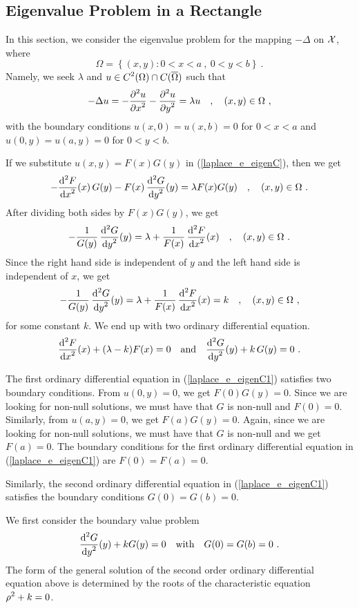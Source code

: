 \subsection{Eigenvalue Problem in a Rectangle}

In this section, we consider the eigenvalue problem for the mapping
$-\Delta$ on $\cal X$, where
\[
  \Omega =\left\{ (x,y) : 0 < x < a\ ,\ 0 < y < b \right\} \ .
\]
Namely, we seek $\lambda$ and
$\displaystyle u \in C^2(\Omega)\cap C(\overline{\Omega})$ such that
\begin{equation} \label{laplace_e_eigenC}
-\Delta u = -\frac{\displaystyle \partial^{2}{u}} {\displaystyle \partial x^{2}} - \frac{\displaystyle \partial^{2}{u}} {\displaystyle \partial y^{2}} = \lambda u
\quad , \quad (x,y) \in \Omega \ ,
\end{equation}
with the boundary conditions $u(x,0) = u(x,b) = 0$ for $0<x<a$ and
$u(0,y) = u(a,y) = 0$ for $0<y<b$.

If we substitute $u(x,y) = F(x)G(y)$ in (\ref{laplace_e_eigenC}), then
we get
\[
-\frac{\displaystyle \mathrm{d}^{2}{F}} {\displaystyle \mathrm{d}{x}^{2}}(x)\, G(y) - F(x)\,\frac{\displaystyle \mathrm{d}^{2}{G}} {\displaystyle \mathrm{d}{y}^{2}}(y) = \lambda
F(x)G(y) \quad , \quad (x,y) \in \Omega \ .
\]
After dividing both sides by $F(x)G(y)$, we get
\[
-\frac{1}{G(y)} \, \frac{\displaystyle \mathrm{d}^{2}{G}} {\displaystyle \mathrm{d}{y}^{2}}(y) =
\lambda + \frac{1}{F(x)}\,\frac{\displaystyle \mathrm{d}^{2}{F}} {\displaystyle \mathrm{d}{x}^{2}}(x)
\quad , \quad (x,y) \in \Omega \ .
\]
Since the right hand side is independent of $y$ and the left hand side
is independent of $x$, we get
\[
-\frac{1}{G(y)} \, \frac{\displaystyle \mathrm{d}^{2}{G}} {\displaystyle \mathrm{d}{y}^{2}}(y) = \lambda + \frac{1}{F(x)}\,
\frac{\displaystyle \mathrm{d}^{2}{F}} {\displaystyle \mathrm{d}{x}^{2}}(x) = k \quad , \quad (x,y) \in \Omega \ ,
\]
for some constant $k$.  We end up with two ordinary differential equation.
\begin{equation} \label{laplace_e_eigenC1}
\frac{\displaystyle \mathrm{d}^{2}{F}} {\displaystyle \mathrm{d}{x}^{2}}(x) + (\lambda-k) F(x) = 0 \quad \text{and}
\quad \frac{\displaystyle \mathrm{d}^{2}{G}} {\displaystyle \mathrm{d}{y}^{2}}(y) + k\,G(y) = 0 \  .
\end{equation}

The first ordinary differential equation in
(\ref{laplace_e_eigenC1}) satisfies two boundary
conditions.   From $u(0,y) = 0$, we get $F(0)G(y)=0$.  Since we are
looking for non-null solutions, we must have that $G$ is
non-null and $F(0)=0$.  Similarly, from
$u(a,y) = 0$, we get $F(a)G(y)=0$.  Again, since we are
looking for non-null solutions, we must have that $G$ is
non-null and we get $F(a)=0$.  The boundary conditions for
the first ordinary differential equation in (\ref{laplace_e_eigenC1})
are $F(0)=F(a)=0$.

Similarly, the second ordinary differential equation in
(\ref{laplace_e_eigenC1}) satisfies the boundary conditions $G(0)=G(b)=0$.

We first consider the boundary value problem
\begin{equation} \label{laplace_e_eigenC2}
\dydxn{G}{y}{2}(y) + k G(y) = 0 \quad \text{with} \quad G(0)=G(b)=0 \ .
\end{equation}
The form of the general solution of the second order ordinary differential equation above is
determined by the roots of the characteristic equation
$\displaystyle \rho^2 + k=0$.

